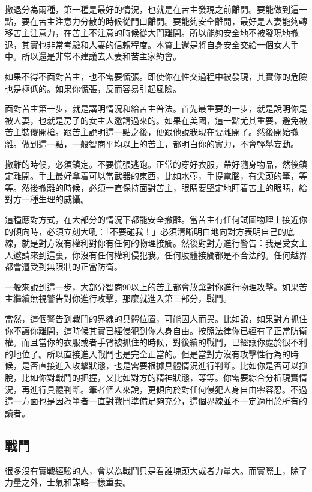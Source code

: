 撤退分為兩種，第一種是最好的情況，也就是在苦主發現之前離開。要能做到這一點，要在苦主注意力分散的時候從門口離開。要能夠安全離開，最好是人妻能夠轉移苦主注意力，在苦主不注意的時候從大門離開。所以能夠安全地不被發現地撤退，其實也非常考驗和人妻的信賴程度。本質上還是將自身安全交給一個女人手中。所以還是非常不建議去人妻和苦主家約會。

如果不得不面對苦主，也不需要慌張。即使你在性交過程中被發現，其實你的危險也是極低的。如果你慌張，反而容易引起風險。

面對苦主第一步，就是講明情況和給苦主普法。首先最重要的一步，就是說明你是被人妻，也就是房子的女主人邀請過來的。如果在美國，這一點尤其重要，避免被苦主裝傻開槍。跟苦主說明這一點之後，便跟他說我現在要離開了。然後開始撤離。做到這一點，一般智商平均以上的苦主，都明白你的實力，不會輕舉妄動。

撤離的時候，必須鎮定。不要慌張逃跑。正常的穿好衣服，帶好隨身物品，然後鎮定離開。手上最好拿着可以當武器的東西，比如水壺，手提電腦，有尖頭的筆，等等。然後撤離的時候，必須一直保持面對苦主，眼睛要堅定地盯着苦主的眼睛，給對方一種生理的威懾。

這種應對方式，在大部分的情況下都能安全撤離。當苦主有任何試圖物理上接近你的傾向時，必須立刻大吼：「不要碰我！」必須清晰明白地向對方表明自己的底線，就是對方沒有權利對你有任何的物理接觸。然後對對方進行警告：我是受女主人邀請來到這裏，你沒有任何權利侵犯我。任何肢體接觸都是不合法的。任何越界都會遭受到無限制的正當防衛。

一般來說到這一步，大部分智商90以上的苦主都會放棄對你進行物理攻擊。如果苦主繼續無視警告對你進行攻擊，那麼就進入第三部分，戰鬥。

當然，這個警告到戰鬥的界線的具體位置，可能因人而異。比如說，如果對方抓住你不讓你離開，這時候其實已經侵犯到你人身自由。按照法律你已經有了正當防衛權。而且當你的衣服或者手臂被抓住的時候，對後續的戰鬥，已經讓你處於很不利的地位了。所以直接進入戰鬥也是完全正當的。但是當對方沒有攻擊性行為的時候，是否直接進入攻擊狀態，也是需要根據具體情況進行判斷。比如你是否可以掙脫，比如你對戰鬥的把握，又比如對方的精神狀態，等等。你需要綜合分析現實情況，再進行具體判斷。筆者個人來說，更傾向於對任何侵犯人身自由零容忍。不過這一方面也是因為筆者一直對戰鬥準備足夠充分，這個界線並不一定適用於所有的讀者。

\subsection{戰鬥}

很多沒有實戰經驗的人，會以為戰鬥只是看誰塊頭大或者力量大。而實際上，除了力量之外，士氣和謀略一樣重要。


